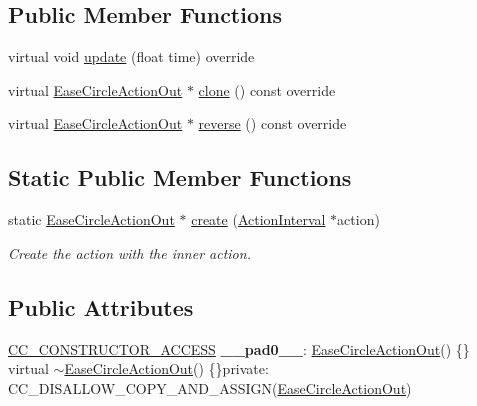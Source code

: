 \subsection*{Public Member Functions}
\begin{DoxyCompactItemize}
\item 
virtual void \hyperlink{classEaseCircleActionOut_a48e4c603a5dd0eb56f289dd2ffd8d26b}{update} (float time) override
\item 
virtual \hyperlink{classEaseCircleActionOut}{Ease\+Circle\+Action\+Out} $\ast$ \hyperlink{classEaseCircleActionOut_af7b506b72c223ae7ed2268dad54e5416}{clone} () const override
\item 
virtual \hyperlink{classEaseCircleActionOut}{Ease\+Circle\+Action\+Out} $\ast$ \hyperlink{classEaseCircleActionOut_aa42aec9f04ec15a24fd9deed855f9529}{reverse} () const override
\end{DoxyCompactItemize}
\subsection*{Static Public Member Functions}
\begin{DoxyCompactItemize}
\item 
static \hyperlink{classEaseCircleActionOut}{Ease\+Circle\+Action\+Out} $\ast$ \hyperlink{classEaseCircleActionOut_a4c13e168f159496d6a9990bf81e579ab}{create} (\hyperlink{classActionInterval}{Action\+Interval} $\ast$action)
\begin{DoxyCompactList}\small\item\em Create the action with the inner action. \end{DoxyCompactList}\end{DoxyCompactItemize}
\subsection*{Public Attributes}
\begin{DoxyCompactItemize}
\item 
\mbox{\label{classEaseCircleActionOut_ac3118b608809b266df9503b66278e046}} 
\hyperlink{_2cocos2d_2cocos_2base_2ccConfig_8h_a25ef1314f97c35a2ed3d029b0ead6da0}{C\+C\+\_\+\+C\+O\+N\+S\+T\+R\+U\+C\+T\+O\+R\+\_\+\+A\+C\+C\+E\+SS} {\bfseries \+\_\+\+\_\+pad0\+\_\+\+\_\+}\+: \hyperlink{classEaseCircleActionOut}{Ease\+Circle\+Action\+Out}() \{\} virtual $\sim$\hyperlink{classEaseCircleActionOut}{Ease\+Circle\+Action\+Out}() \{\}private\+: C\+C\+\_\+\+D\+I\+S\+A\+L\+L\+O\+W\+\_\+\+C\+O\+P\+Y\+\_\+\+A\+N\+D\+\_\+\+A\+S\+S\+I\+GN(\hyperlink{classEaseCircleActionOut}{Ease\+Circle\+Action\+Out})
\end{DoxyCompactItemize}
